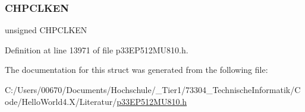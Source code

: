 \subsubsection{\texorpdfstring{C\+H\+P\+C\+L\+K\+EN}{CHPCLKEN}}
{\footnotesize\ttfamily unsigned C\+H\+P\+C\+L\+K\+EN}



Definition at line 13971 of file p33\+E\+P512\+M\+U810.\+h.



The documentation for this struct was generated from the following file\+:\begin{DoxyCompactItemize}
\item 
C\+:/\+Users/00670/\+Documents/\+Hochschule/\+\_\+\+Tier1/73304\+\_\+\+Technische\+Informatik/\+Code/\+Hello\+World4.\+X/\+Literatur/\hyperlink{p33_e_p512_m_u810_8h}{p33\+E\+P512\+M\+U810.\+h}\end{DoxyCompactItemize}

